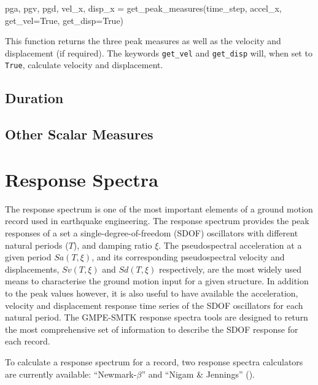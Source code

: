 \begin{python}[frame=single]
pga, pgv, pgd, vel_x, disp_x = get_peak_measures(time_step,
                                                 accel_x,
                                                 get_vel=True,
                                                 get_disp=True)
\end{python}

\noindent This function returns the three peak measures as well as the velocity and displacement (if required). The keywords \verb=get_vel= and \verb=get_disp= will, when set to \verb=True=, calculate velocity and displacement.

\subsection{Duration}
\subsection{Other Scalar Measures}

\section{Response Spectra}
\label{sec:response_spectra}

The response spectrum is one of the most important elements of a ground motion record used in earthquake engineering. The response spectrum provides the peak responses of a set a single-degree-of-freedom (SDOF) oscillators with different natural periods ($T$), and damping ratio $\xi$. The pseudospectral acceleration at a given period $Sa \left({T, \xi} \right)$, and its corresponding pseudospectral velocity and displacements, $Sv \left( {T, \xi} \right)$ and $Sd \left( {T, \xi} \right)$ respectively, are the most widely used means to characterise the ground motion input for a given structure. In addition to the peak values however, it is also useful to have available the acceleration, velocity and displacement response time series of the SDOF oscillators for each natural period. The GMPE-SMTK response spectra tools are designed to return the most comprehensive set of information to describe the SDOF response for each record.

To calculate a response spectrum for a record, two response spectra calculators are currently available: ``Newmark-$\beta$'' and ``Nigam \& Jennings'' (\cite{NigamJennings1969}).

